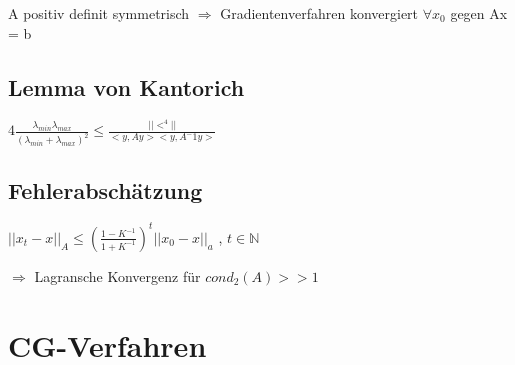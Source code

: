 \documentclass[12pt,a4paper]{article} %
\newcommand*\tab[1][1cm]{\hspace*{#1}}
\begin{document}
	A positiv definit symmetrisch $\Rightarrow$ Gradientenverfahren konvergiert $\forall x_0$ gegen Ax = b
	
	\subsection{Lemma von Kantorich}
	
	$ 4 \frac{\lambda_{min} \lambda_{max}}{(\lambda_{min} + \lambda_{max})^2} \le \frac{||<^4||}{<y, Ay><y, A^-1y>}$
	
	\subsection{Fehlerabschätzung}
	
	$||x_t - x||_A \le (\frac{1 - K^{-1}}{1 + K^{-1}})^t ||x_0 - x||_a$ \tab , $t \in \mathbb{N}$
	
	$\Rightarrow$ Lagransche Konvergenz für $cond_2(A) >> 1$
	
	\newpage
	
	\section{CG-Verfahren}
	
\end{document}
